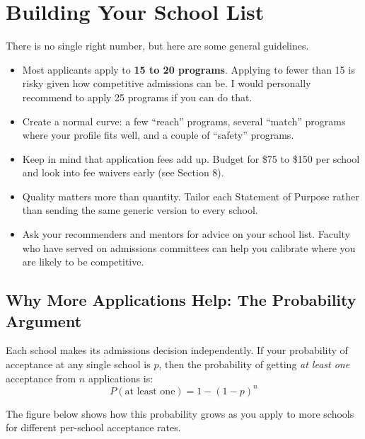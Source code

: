 \documentclass[11pt, letterpaper]{article}
\begin{document}
\newpage
\section{Building Your School List}

There is no single right number, but here are some general guidelines.

\begin{itemize}[leftmargin=*, itemsep=2pt]
    \item Most applicants apply to \textbf{15 to 20 programs}. Applying to fewer than 15 is risky given how competitive admissions can be. I would personally recommend to apply 25 programs if you can do that.
    \item Create a normal curve: a few ``reach'' programs, several ``match'' programs where your profile fits well, and a couple of ``safety'' programs.
    \item Keep in mind that application fees add up. Budget for \$75 to \$150 per school and look into fee waivers early (see Section 8).
    \item Quality matters more than quantity. Tailor each Statement of Purpose rather than sending the same generic version to every school.
    \item Ask your recommenders and mentors for advice on your school list. Faculty who have served on admissions committees can help you calibrate where you are likely to be competitive.
\end{itemize}

\subsection{Why More Applications Help: The Probability Argument}

Each school makes its admissions decision independently. If your probability of acceptance at any single school is $p$, then the probability of getting \textit{at least one} acceptance from $n$ applications is:
$$P(\text{at least one}) = 1 - (1 - p)^{n}$$

The figure below shows how this probability grows as you apply to more schools for different per-school acceptance rates.
\end{document}
